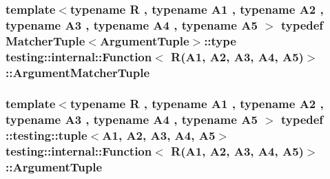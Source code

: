 \subsubsection[{\texorpdfstring{Argument\+Matcher\+Tuple}{ArgumentMatcherTuple}}]{\setlength{\rightskip}{0pt plus 5cm}template$<$typename R , typename A1 , typename A2 , typename A3 , typename A4 , typename A5 $>$ typedef {\bf Matcher\+Tuple}$<${\bf Argument\+Tuple}$>$\+::type {\bf testing\+::internal\+::\+Function}$<$ R(A1, A2, A3, A4, A5)$>$\+::{\bf Argument\+Matcher\+Tuple}}\hypertarget{structtesting_1_1internal_1_1Function_3_01R_07A1_00_01A2_00_01A3_00_01A4_00_01A5_08_4_a03c18380538e53141227afe6d0f20cc8}{}\label{structtesting_1_1internal_1_1Function_3_01R_07A1_00_01A2_00_01A3_00_01A4_00_01A5_08_4_a03c18380538e53141227afe6d0f20cc8}
\subsubsection[{\texorpdfstring{Argument\+Tuple}{ArgumentTuple}}]{\setlength{\rightskip}{0pt plus 5cm}template$<$typename R , typename A1 , typename A2 , typename A3 , typename A4 , typename A5 $>$ typedef \+::testing\+::tuple$<$A1, A2, A3, A4, A5$>$ {\bf testing\+::internal\+::\+Function}$<$ R(A1, A2, A3, A4, A5)$>$\+::{\bf Argument\+Tuple}}\hypertarget{structtesting_1_1internal_1_1Function_3_01R_07A1_00_01A2_00_01A3_00_01A4_00_01A5_08_4_af5a1487829347eae2a48b2f66f216f52}{}\label{structtesting_1_1internal_1_1Function_3_01R_07A1_00_01A2_00_01A3_00_01A4_00_01A5_08_4_af5a1487829347eae2a48b2f66f216f52}
